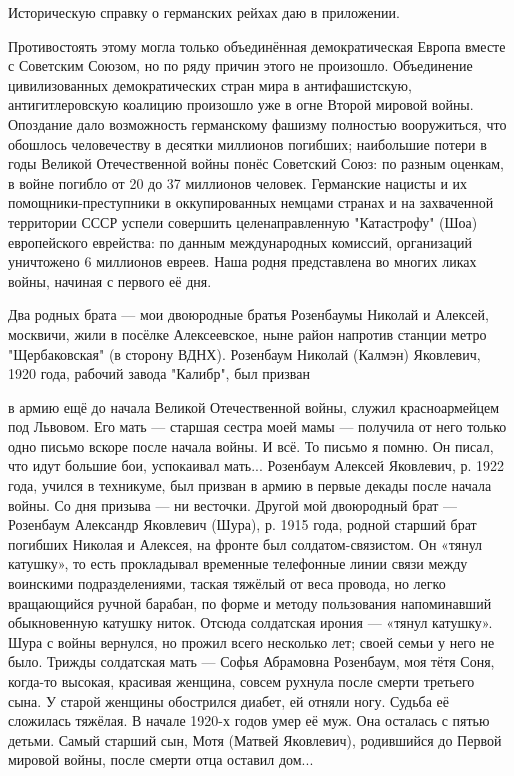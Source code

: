 Историческую справку о германских рейхах даю в приложении.


\label{27-1}
Противостоять этому могла только объединённая демократическая Европа вместе с Советским Союзом, но по ряду причин этого не произошло. Объединение цивилизованных демократических стран мира в антифашистскую, антигитлеровскую коалицию произошло уже в огне Второй мировой войны. Опоздание дало возможность германскому фашизму полностью вооружиться, что обошлось человечеству в десятки миллионов погибших; наибольшие потери в годы Великой Отечественной войны понёс Советский Союз: по разным оценкам, в войне погибло от 20 до 37 миллионов человек. Германские нацисты и их помощники-преступники в оккупированных немцами странах и на захваченной территории СССР успели совершить целенаправленную "Катастрофу" (Шоа) европейского еврейства: по данным международных комиссий, организаций уничтожено 6 миллионов евреев. Наша родня представлена во многих ликах войны, начиная с первого её дня. 

Два родных брата — мои двоюродные братья Розенбаумы Николай и Алексей, москвичи, жили в посёлке Алексеевское, ныне район напротив станции метро "Щербаковская" (в сторону ВДНХ). Розенбаум Николай (Калмэн) Яковлевич, 1920 года, рабочий завода "Калибр", был призван 

\label{28-1}
в армию ещё до начала Великой Отечественной войны, служил красноармейцем под Львовом. Его мать — старшая сестра моей мамы — получила от него только одно письмо вскоре после начала войны. И всё. То письмо я помню. Он писал, что идут большие бои, успокаивал мать... 
Розенбаум Алексей Яковлевич, р. 1922 года, учился в техникуме, был призван в армию в первые декады после начала войны. Со дня призыва — ни весточки. 
Другой мой двоюродный брат — Розенбаум Александр Яковлевич (Шура), р. 1915 года, родной старший брат погибших Николая и Алексея, на фронте был солдатом-связистом. Он «тянул катушку», то есть прокладывал временные телефонные линии связи между воинскими подразделениями, таская тяжёлый от веса провода, но легко вращающийся ручной барабан, по форме и методу пользования напоминавший обыкновенную катушку ниток. Отсюда солдатская ирония — «тянул катушку». Шура с войны вернулся, но прожил всего несколько лет; своей семьи у него не было. 
Трижды солдатская мать — Софья Абрамовна Розенбаум, моя тётя Соня, когда-то высокая, красивая женщина, совсем рухнула после смерти третьего сына. У старой женщины обострился диабет, ей отняли ногу. Судьба её сложилась тяжёлая. В начале 1920-х годов умер её муж. Она осталась с пятью детьми. Самый старший сын, Мотя (Матвей Яковлевич), родившийся до Первой мировой войны, после смерти отца оставил дом...

